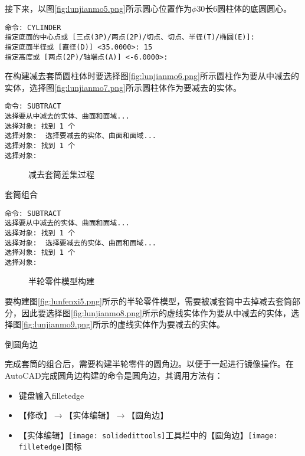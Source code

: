 \begin{procedure}
接下来，以图\ref{fig:lunjianmo5.png}所示圆心位置作为$\phi 30$长6圆柱体的底圆圆心。
\begin{lstlisting}
命令: CYLINDER
指定底面的中心点或 [三点(3P)/两点(2P)/切点、切点、半径(T)/椭圆(E)]:
指定底面半径或 [直径(D)] <35.0000>: 15
指定高度或 [两点(2P)/轴端点(A)] <-6.0000>:
\end{lstlisting}



在构建减去套筒圆柱体时要选择图\ref{fig:lunjianmo6.png}所示圆柱作为要从中减去的实体，选择图\ref{fig:lunjianmo7.png}所示圆柱体作为要减去的实体。
\begin{lstlisting}
命令: SUBTRACT
选择要从中减去的实体、曲面和面域...
选择对象: 找到 1 个
选择对象:  选择要减去的实体、曲面和面域...
选择对象: 找到 1 个
选择对象:
\end{lstlisting}

\begin{figure}[htbp]
\centering
{}\hspace{40pt}
\caption{减去套筒差集过程}
\end{figure}
\item 套筒组合

\begin{lstlisting}
命令: SUBTRACT
选择要从中减去的实体、曲面和面域...
选择对象: 找到 1 个
选择对象:  选择要减去的实体、曲面和面域...
选择对象: 找到 1 个
选择对象:
\end{lstlisting}

\begin{figure}[htbp]
\centering
{}\hspace{40pt}
\caption{半轮零件模型构建}
\end{figure}

要构建图\ref{fig:lunfenxi5.png}所示的半轮零件模型，需要被减套筒中去掉减去套筒部分，因此要选择图\ref{fig:lunjianmo8.png}所示的虚线实体作为要从中减去的实体，选择图\ref{fig:lunjianmo9.png}所示的虚线实体作为要减去的实体。

\item 倒圆角边

完成套筒的组合后，需要构建半轮零件的圆角边。以便于一起进行镜像操作。在AutoCAD完成圆角边构建的命令是圆角边，其调用方法有：
\begin{itemize}
\item 键盘输入filletedge
\item 【修改】$\rightarrow $【实体编辑】$\rightarrow $【圆角边】
\item 【实体编辑】\texttt{[image: solidedittools]}工具栏中的【圆角边】\texttt{[image: filletedge]}图标
\end{itemize}


\end{procedure}
